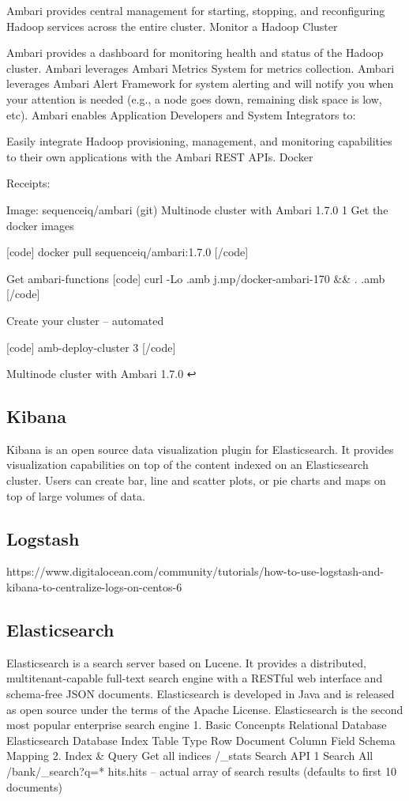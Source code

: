 Ambari provides central management for starting, stopping, and reconfiguring Hadoop services across the entire cluster.
Monitor a Hadoop Cluster

Ambari provides a dashboard for monitoring health and status of the Hadoop cluster.
Ambari leverages Ambari Metrics System for metrics collection.
Ambari leverages Ambari Alert Framework for system alerting and will notify you when your attention is needed (e.g., a node goes down, remaining disk space is low, etc).
Ambari enables Application Developers and System Integrators to:

Easily integrate Hadoop provisioning, management, and monitoring capabilities to their own applications with the Ambari REST APIs.
Docker


Receipts:

Image: sequenceiq/ambari (git)
Multinode cluster with Ambari 1.7.0 1
Get the docker images

[code] docker pull sequenceiq/ambari:1.7.0 [/code]

Get ambari-functions [code] curl -Lo .amb j.mp/docker-ambari-170 && . .amb [/code]

Create your cluster – automated

[code] amb-deploy-cluster 3 [/code]

Multinode cluster with Ambari 1.7.0 ↩

\subsection{Kibana}

Kibana is an open source data visualization plugin for Elasticsearch. It provides visualization capabilities on top of the content indexed on an Elasticsearch cluster. Users can create bar, line and scatter plots, or pie charts and maps on top of large volumes of data.

\subsection{Logstash}

https://www.digitalocean.com/community/tutorials/how-to-use-logstash-and-kibana-to-centralize-logs-on-centos-6

\subsection{Elasticsearch}


Elasticsearch is a search server based on Lucene. It provides a distributed, multitenant-capable full-text search engine with a RESTful web interface and schema-free JSON documents. Elasticsearch is developed in Java and is released as open source under the terms of the Apache License. Elasticsearch is the second most popular enterprise search engine
1. Basic Concenpts
Relational Database	Elasticsearch
Database	Index
Table	Type
Row	Document
Column	Field
Schema	Mapping
2. Index & Query
Get all indices
/_stats
Search API 1
Search All
/bank/_search?q=*
hits.hits – actual array of search results (defaults to first 10 documents)

